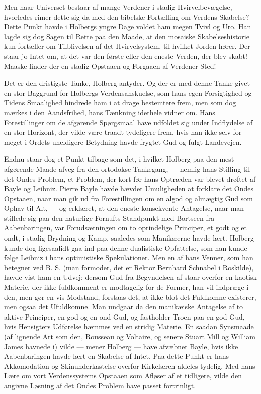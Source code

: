 \documentclass[12pt,a4paper,openany]{book}
\newcommand{\opage}[1]{\marginnote{\footnotesize\textit{[#1]}}}
\begin{document}
Men naar Universet bestaar af mange Verdener i stadig Hvirvelbevægelse,
hvorledes rimer dette sig da med den bibelske Fortælling om Verdens Skabelse?
Dette Punkt havde i Holbergs yngre Dage voldet ham megen Tvivl og Uro. Han
lagde sig dog Sagen til Rette paa den Maade, at den mosaiske Skabelseshistorie
kun fortæller om Tilblivelsen af det Hvirvelsystem, til hvilket Jorden hører.
Der staar jo Intet om, at det var den første eller den eneste Verden, der
\setcounter{footnote}{0}%
\opage{14}blev skabt! Maaske finder der en stadig Opstaaen og Forgaaen af
Verdener Sted!

Det er den dristigste Tanke, Holberg antyder. Og der er med denne Tanke givet
en stor Baggrund for Holbergs Verdensanskuelse, som hans egen Forsigtighed og
Tidens Smaalighed hindrede ham i at drage bestemtere frem, men som dog mærkes i
den Aandsfrihed, hans Tænkning idethele vidner om. Hans Forestillinger om de
afgørende Spørgsmaal have udfoldet sig under Indflydelse af en stor Horizont,
der vilde være traadt tydeligere frem, hvis han ikke selv for meget i Ordets
uheldigere Betydning havde frygtet Gud og fulgt Landevejen.

Endnu staar dog et Punkt tilbage som det, i hvilket Holberg paa den mest
afgørende Maade afveg fra den ortodokse Tankegang, --- nemlig hans Stilling til
det Ondes Problem, et Problem, der kort før hans Optræden var blevet drøftet af
Bayle og Leibniz. Pierre Bayle havde hævdet Umuligheden at forklare det Ondes
Opstaaen, naar man gik ud fra Forestillingen om en algod og almægtig Gud som
Ophav til Alt, --- og erklæret, at den eneste konsekvente Antagelse, naar man
stillede sig paa den naturlige Fornufts Standpunkt med Bortseen fra
Aabenbaringen, var Forudsætningen om to oprindelige Principer, et godt og et
ondt, i stadig Brydning og Kamp, saaledes som Manikæerne havde lært. Holberg
kunde dog ligesaalidt gaa ind paa denne dualistiske Opfattelse, som han kunde
følge Leibniz i hans optimistiske Spekulationer. Men en af hans Venner, som han
betegner ved B. S. (man formoder, det er Rektor Bernhard Schnabel i Roskilde),
havde vist ham en Udvej: dersom Gud fra Begyndelsen af staar overfor en kaotisk
Materie, der ikke fuldkomment er modtagelig for de Former, han vil indpræge i
den, men gør en vis Modstand, forstaas det, at ikke blot det Fuldkomne
existerer, men ogsaa det Ufuldkomne. Man undgaar da den manikæiske Antagelse af
to aktive Principer, en god og en ond Gud, og fastholder Troen paa en god Gud,
hvis Hensigters Udførelse hæmmes ved en stridig Materie. En saadan Synsmaade
(af lignende Art som den, Rousseau
\setcounter{footnote}{0}%
\opage{15}og Voltaire, og senere Stuart Mill og William James havnede i) vilde
--- mener Holberg --- have afvæbnet Bayle, hvis ikke Aabenbaringen havde lært
en Skabelse af Intet. Paa dette Punkt er hans Akkomodation og Skinunderkastelse
overfor Kirkelæren aldeles tydelig. Med hans Lære om vort Verdenssystems
Opstaaen som Afløser af et tidligere, vilde den angivne Løsning af det Ondes
Problem have passet fortrinligt.
\end{document}
